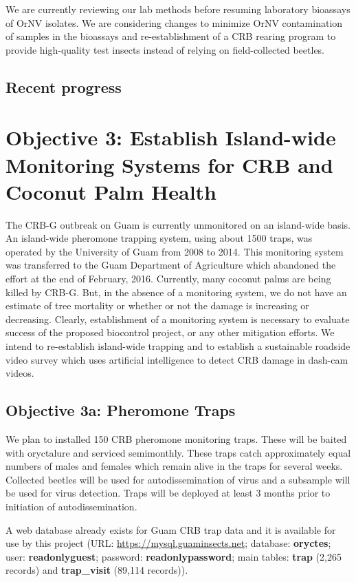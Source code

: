 \documentclass[12pt,letterpaper,english,bibliography=totocnumbered, abstract=on]{scrartcl}
\begin{document}
We are currently reviewing our lab methods before resuming laboratory bioassays of OrNV isolates. We are considering changes to minimize OrNV contamination of samples in the bioassays and re-establishment of a CRB rearing program to provide high-quality test insects instead of relying on field-collected beetles.

\subsection{Recent progress}


\clearpage
\section{Objective 3:  Establish Island-wide Monitoring Systems for CRB and Coconut Palm Health}
\label{monitoring}

\begin{framed}
The CRB-G outbreak on Guam is currently unmonitored on an island-wide basis. An island-wide pheromone trapping system, using about 1500 traps, was operated by the University of Guam from 2008 to 2014. This monitoring system was transferred to the Guam Department of Agriculture which abandoned the effort at the end of February, 2016.  Currently, many coconut palms are being killed by CRB-G. But, in the absence of a monitoring system, we do not have an estimate of tree mortality or whether or not the damage is increasing or decreasing. Clearly, establishment of a monitoring system is necessary to evaluate success of the proposed biocontrol project, or any other mitigation efforts. We intend to re-establish island-wide trapping and to establish a sustainable roadside video survey which uses artificial intelligence to detect CRB damage in dash-cam videos. 
\end{framed}

\subsection{Objective 3a: Pheromone Traps}

\begin{framed}
We plan to installed 150 CRB pheromone monitoring traps. These will be baited with oryctalure and serviced semimonthly. These traps catch approximately equal numbers of males and females which remain alive in the traps for several weeks. Collected beetles will be used for autodissemination of virus and a subsample will be used for virus detection. Traps will be deployed at least 3 months prior to initiation of autodissemination.  

A web database already exists for Guam CRB trap data and it is available for use by this project (URL: \url{https://mysql.guaminsects.net}; database: \textbf{oryctes}; user: \textbf{readonlyguest}; password: \textbf{readonlypassword}; main tables: \textbf{trap} (2,265 records) and \textbf{trap\_visit} (89,114 records)).
\end{framed}
\end{document}
